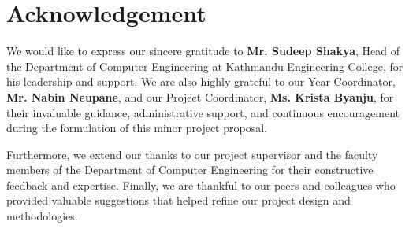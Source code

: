\chapter*{Acknowledgement}

 We would like to express our sincere gratitude to \textbf{Mr. Sudeep Shakya}, Head of the Department of Computer Engineering at Kathmandu Engineering College, for his leadership and support. We are also highly grateful to our Year Coordinator, \textbf{Mr. Nabin Neupane}, and our Project Coordinator, \textbf{Ms. Krista Byanju}, for their invaluable guidance, administrative support, and continuous encouragement during the formulation of this minor project proposal.

Furthermore, we extend our thanks to our project supervisor and the faculty members of the Department of Computer Engineering for their constructive feedback and expertise. Finally, we are thankful to our peers and colleagues who provided valuable suggestions that helped refine our project design and methodologies.



\clearpage
